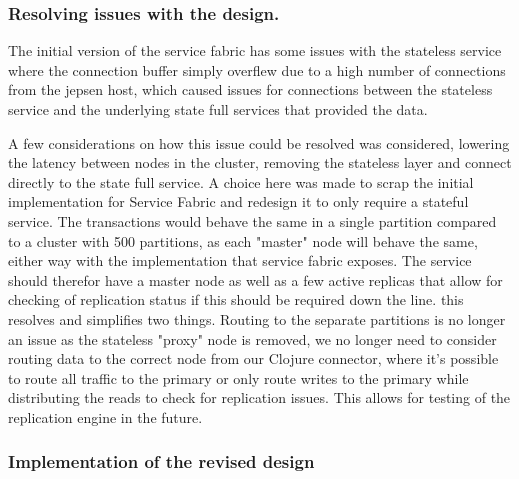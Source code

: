 \documentclass[a4paper,10pt,titlepage]{report}
\begin{document}
\subsubsection{Resolving issues with the design.}
    

The initial version of the service fabric has some issues with the stateless service where the connection buffer simply overflew due to a high number of connections from the jepsen host, which caused issues for connections between the stateless service and the underlying state full services that provided the data.

A few considerations on how this issue could be resolved was considered, lowering the latency between nodes in the cluster, removing the stateless layer and connect directly to the state full service. A choice here was made to scrap the initial implementation for Service Fabric and redesign it to only require a stateful service. The transactions would behave the same in a  single partition compared to a cluster with 500 partitions, as each "master" node will behave the same, either way with the implementation that service fabric exposes. The service should therefor have a master node as well as a few active replicas that allow for checking of replication status if this should be required down the line. this resolves and simplifies two things. Routing to the separate partitions is no longer an issue as the stateless "proxy" node is removed, we no longer need to consider routing data to the correct node from our Clojure connector, where it's possible to route all traffic to the primary or only route writes to the primary while distributing the reads to check for replication issues. This allows for testing of the replication engine in the future.

 \subsubsection{Implementation of the revised design}
\end{document}
